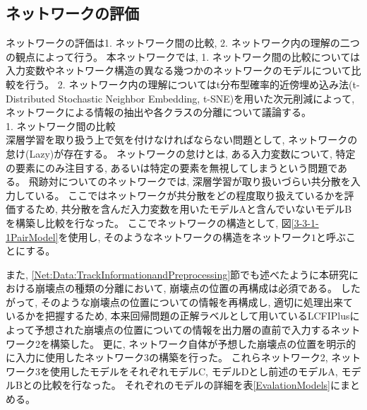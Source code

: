 \subsection{ネットワークの評価} \label{Net:PM:PerformanceofPM}

ネットワークの評価は1. ネットワーク間の比較, 2. ネットワーク内の理解の二つの観点によって行う。
本ネットワークでは, 1. ネットワーク間の比較については入力変数やネットワーク構造の異なる幾つかのネットワークのモデルについて比較を行う。
2. ネットワーク内の理解についてはt分布型確率的近傍埋め込み法(t-Distributed Stochastic Neighbor Embedding, t-SNE\cite{t-SNEpaper})を用いた次元削減によって, ネットワークによる情報の抽出や各クラスの分離について議論する。\\

1. ネットワーク間の比較\\

深層学習を取り扱う上で気を付けなければならない問題として, ネットワークの怠け(Lazy)が存在する。
ネットワークの怠けとは, ある入力変数について, 特定の要素にのみ注目する, あるいは特定の要素を無視してしまうという問題である。
飛跡対についてのネットワークでは, 深層学習が取り扱いづらい共分散を入力している。
ここではネットワークが共分散をどの程度取り扱えているかを評価するため, 共分散を含んだ入力変数を用いたモデルAと含んでいないモデルBを構築し比較を行なった。
ここでネットワークの構造として, 図\ref{3-3-1-1PairModel}を使用し, そのようなネットワークの構造をネットワーク$1$と呼ぶことにする。

また, \ref{Net:Data:TrackInformationandPreprocessing}節でも述べたように本研究における崩壊点の種類の分離において, 崩壊点の位置の再構成は必須である。
したがって, そのような崩壊点の位置についての情報を再構成し, 適切に処理出来ているかを把握するため, 本来回帰問題の正解ラベルとして用いているLCFIPlusによって予想された崩壊点の位置についての情報を出力層の直前で入力するネットワーク2を構築した。
更に, ネットワーク自体が予想した崩壊点の位置を明示的に入力に使用したネットワーク3の構築を行った。
これらネットワーク2, ネットワーク3を使用したモデルをそれぞれモデルC, モデルDとし前述のモデルA, モデルBとの比較を行なった。
それぞれのモデルの詳細を表\ref{EvalationModels}にまとめる。

